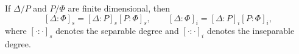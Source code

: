 If $\Delta/P$ and $P/\Phi$ are finite dimensional, then
$$[\Delta:\Phi]_s = [\Delta:P]_s[P:\Phi]_s, \qquad [\Delta:\Phi]_i = [\Delta:P]_i[P:\Phi]_i,$$
where $[\cdot:\cdot]_s$ denotes the separable degree and $[\cdot:\cdot]_i$ denotes the inseparable degree.
